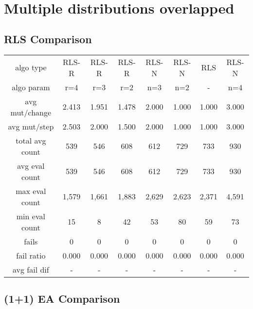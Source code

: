 
\section{Multiple distributions overlapped}

\subsection{RLS Comparison}


\begin{tabular}[h]{cccccccc}
algo type&           RLS-R&    RLS-R&    RLS-R&    RLS-N&    RLS-N&      RLS&    RLS-N\\
algo param&            r=4&      r=3&      r=2&      n=3&      n=2&        -&      n=4\\
avg mut/change&      2.413&    1.951&    1.478&    2.000&    1.000&    1.000&    3.000\\
avg mut/step&        2.503&    2.000&    1.500&    2.000&    1.000&    1.000&    3.000\\
\hline
total avg count&       539&      546&      608&      612&      729&      733&      930\\
avg eval count&        539&      546&      608&      612&      729&      733&      930\\
max eval count&      1,579&    1,661&    1,883&    2,629&    2,623&    2,371&    4,591\\
min eval count&         15&        8&       42&       53&       80&       59&       73\\
\hline
fails&                   0&        0&        0&        0&        0&        0&        0\\
fail ratio&          0.000&    0.000&    0.000&    0.000&    0.000&    0.000&    0.000\\
avg fail dif&            -&        -&        -&        -&        -&        -&        -\\
\end{tabular}


\subsection{(1+1) EA Comparison}


